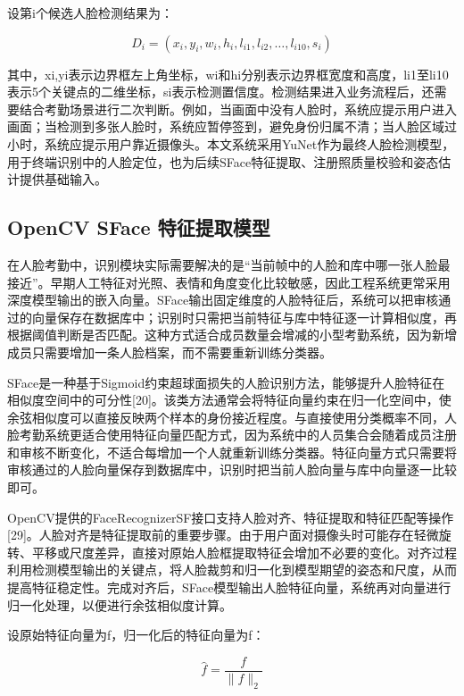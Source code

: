 \documentclass[UTF8]{heuthesis}
\begin{document}
设第i个候选人脸检测结果为：

\begin{equation*}
D_i=(x_i,y_i,w_i,h_i,l_{i1},l_{i2},\ldots,l_{i10},s_i)\tag{2.1}
\end{equation*}

其中，xi,yi表示边界框左上角坐标，wi和hi分别表示边界框宽度和高度，li1至li10表示5个关键点的二维坐标，si表示检测置信度。检测结果进入业务流程后，还需要结合考勤场景进行二次判断。例如，当画面中没有人脸时，系统应提示用户进入画面；当检测到多张人脸时，系统应暂停签到，避免身份归属不清；当人脸区域过小时，系统应提示用户靠近摄像头。本文系统采用YuNet作为最终人脸检测模型，用于终端识别中的人脸定位，也为后续SFace特征提取、注册照质量校验和姿态估计提供基础输入。

\subsection{OpenCV SFace 特征提取模型}
在人脸考勤中，识别模块实际需要解决的是“当前帧中的人脸和库中哪一张人脸最接近”。早期人工特征对光照、表情和角度变化比较敏感，因此工程系统更常采用深度模型输出的嵌入向量。SFace输出固定维度的人脸特征后，系统可以把审核通过的向量保存在数据库中；识别时只需把当前特征与库中特征逐一计算相似度，再根据阈值判断是否匹配。这种方式适合成员数量会增减的小型考勤系统，因为新增成员只需要增加一条人脸档案，而不需要重新训练分类器。

SFace是一种基于Sigmoid约束超球面损失的人脸识别方法，能够提升人脸特征在相似度空间中的可分性[20]。该类方法通常会将特征向量约束在归一化空间中，使余弦相似度可以直接反映两个样本的身份接近程度。与直接使用分类概率不同，人脸考勤系统更适合使用特征向量匹配方式，因为系统中的人员集合会随着成员注册和审核不断变化，不适合每增加一个人就重新训练分类器。特征向量方式只需要将审核通过的人脸向量保存到数据库中，识别时把当前人脸向量与库中向量逐一比较即可。

OpenCV提供的FaceRecognizerSF接口支持人脸对齐、特征提取和特征匹配等操作[29]。人脸对齐是特征提取前的重要步骤。由于用户面对摄像头时可能存在轻微旋转、平移或尺度差异，直接对原始人脸框提取特征会增加不必要的变化。对齐过程利用检测模型输出的关键点，将人脸裁剪和归一化到模型期望的姿态和尺度，从而提高特征稳定性。完成对齐后，SFace模型输出人脸特征向量，系统再对向量进行归一化处理，以便进行余弦相似度计算。

设原始特征向量为f，归一化后的特征向量为f：

\begin{equation*}
\hat f=\frac{f}{\lVert f\rVert_2}\tag{2.1}
\end{equation*}
\end{document}
